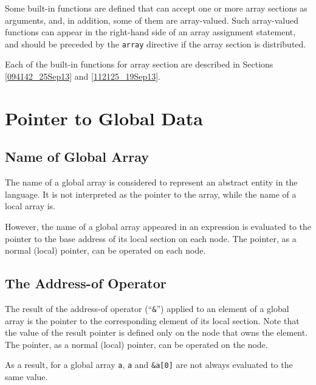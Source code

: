 Some built-in functions are defined that can accept one or more array
sections as arguments, and, in addition, some of them are array-valued.
%
Such array-valued functions can appear in the right-hand side of an
array assignment statement, and should be preceded by the {\tt array}
directive if the array section is distributed.

Each of the built-in functions for array section are described in
Sections \ref{094142_25Sep13} and \ref{112125_19Sep13}.


\section{Pointer to Global Data}
\label{sec:pointer to global data}

\subsection{Name of Global Array}

The name of a global array is considered to represent an abstract entity
in the {\XMP} language. It is not interpreted as the pointer to the array,
while the name of a local array is.

However, the name of a global array appeared in an expression is
evaluated to the pointer to the base address of its local section on
each node. The pointer, as a normal (local) pointer, can be operated on
each node.

\subsection{The Address-of Operator}

The result of the address-of operator (``{\tt \&}'') applied to an
element of a global array is the pointer to the corresponding element of
its local section. Note that the value of the result pointer is defined
only on the node that owns the element. The pointer, as a normal (local)
pointer, can be operated on the node.

As a result, for a global array {\tt a}, {\tt a} and {\tt \&a[0]} are
not always evaluated to the same value.


